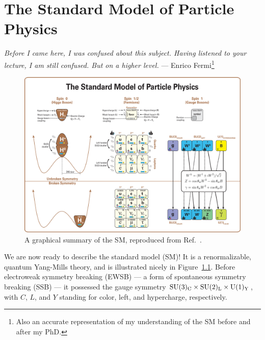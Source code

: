 \chapter{The Standard Model of Particle Physics}
\label{sec:01_sm}

\begin{center}
	\centering
	\noindent
	\textit{Before I came here, I was confused about this subject. Having listened to your lecture, I am still confused. But on a higher level.} --- Enrico Fermi\footnote{Also an accurate representation of my understanding of the SM before and after my PhD.}
\end{center}


\begin{figure}
	\centering
	\captionsetup{justification=centering}
	\includegraphics[width=\textwidth]{figures/01-SM-03-SM/Standard_Model_Of_Particle_Physics--Most_Complete_Diagram.png}
	\caption{A graphical summary of the SM, reproduced from Ref.~\cite{SMMostCompleteDiagram}.}
	\label{fig:01_sm_summary}
\end{figure}

We are now ready to describe the standard model (SM)!
It is a renormalizable, quantum Yang-Mills theory, and is illustrated nicely in Figure~\ref{fig:01_sm_summary}.
Before electroweak symmetry breaking (EWSB) --- a form of spontaneous symmetry breaking (SSB) --- it possessed the gauge symmetry $\SU[3]_\mathrm{C} \times \SU[2]_\mathrm{L} \times \UU[1]_\mathrm{Y}$, with $C$, $L$, and $Y$ standing for color, left, and hypercharge, respectively.

